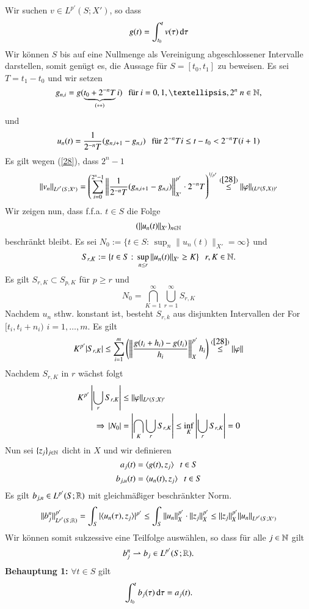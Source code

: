 \item %
Wir suchen $v\in L^{p'}(S;X')$, so dass
\[
    g(t)=\int_{t_0}^t v(\tau) \, \mathrm{d} \tau
\]
Wir können $S$ bis auf eine Nullmenge als Vereinigung abgeschlossener Intervalle darstellen, somit genügt
es, die Aussage für $S=[t_0,t_1]$ zu beweisen. Es sei $T=t_1-t_0$ und wir setzen
\[
    g_{n,i} = g(\underbrace{t_0+2^{-n}T}_{(**)}i) \qq\text{für $i=0,1,…,2^n$ $n\in\N$},
\]
und
\[
    u_n(t)=\frac1{2^{-n}T} (g_{n,i+1}-g_{n,i})\hspace{.25cm} \text{für $2^{-n}Ti\leq t-t_0<2^{-n}T(i+1)$}
\]
Es gilt wegen (\ref{28}), dass $2^n-1$
\begin{align}\label{29}
    \|v_n\|_{L^{p'}(S;X')} = \left( \sum_{i=0}^{2^n-1}\left\| \frac1{2^{-n}T}(g_{n,i+1}-g_{n,i}) \right\|
    ^{p'}_{X'}\cdot 2^{-n}T\right)^{\nicefrac1{p'}} \overset{(\ref{28})}{\leq} \|\varphi\|_{(L^p(S,X))'}
\end{align}
Wir zeigen nun, dass f.f.a. $t\in S$ die Folge
\[
    (\|u_n(t)\|_{X'})_{n\in\mathbb{N}}
\]
beschränkt bleibt. Es sei $N_0:=\{t\in S: \, \sup_{n}\|u_n(t)\|_{X'}=\infty \}$ und
\[
    S_{r,K}:= \{t\in S: \, \sup_{n\leq r} \|u_n(t)\|_{X'}\geq K\} \hspace{.25cm} r,K\in \mathbb{N}.
\]
Es gilt $S_{r,K}\subset S_{p,K}$ für $p\geq r$ und
\[
    N_0 = \bigcap_{K=1}^\infty \bigcup_{r=1}^\infty S_{r,K}
\]
Nachdem $u_n$ sthw. konstant ist, besteht $S_{r,k}$ aus disjunkten Intervallen der For $[t_i,t_i+n_i)$ 
$i=1, … , m$. Es gilt
\[
    K^{p'}|S_{r,K}|\leq \sum_{i=1}^m \left( \left\| \frac{g(t_i+h_i)-g(t_i)}{h_i}\right\|^{p'}_{X} h_i
            \right) \overset{(\ref{28})}{\leq} \|\varphi\|
\]
Nachdem $S_{r,K}$ in $r$ wächst folgt
\begin{align*}
    K^{p'} \left|\bigcup_rS_{r,K}\right| &\leq \|\varphi\|_{L^p(S;X)'}\\
    \Rightarrow \, |N_0|&=\left| \bigcap_K\bigcup_r S_{r,K} \right| \leq \inf_{K}\left|\bigcup _r S_{r,K} \right|
    =0
\end{align*}
Nun sei $\{z_j\}_{j\in\mathbb{N}}$ dicht in $X$ und wir definieren
\[
    a_j(t)=\langle g(t), z_j\rangle \hspace{.25cm} t\in S
\]
\[
    b_{j,u}(t) =\langle u_n(t), z_j \rangle \hspace{.25cm} t\in S 
\]
Es gilt $b_{j,n}\in L^{p'}(S;\mathbb{R})$ mit gleichmäßiger beschränkter Norm.
\[
    \|b_j^n\|_{L^{p'}(S;\mathbb{R})}^{p'}=\int_S|\langle u_n(\tau), z_j\rangle|^{p'}\leq \int_S \|u_n\|_X^{p'} \cdot
    \|z_j\|_X^{p'} \leq \|z_j\|_X^{p'} \|u_n\|_{L^{p'}(S;X')}
\]
Wir können somit sukzessive eine Teilfolge auswählen, so dass für alle $j\in \mathbb{N}$ gilt
\[
    b_j^n\rightharpoonup b_j \in L^{p'}(S;\mathbb{R}).
\]
\textbf{Behauptung 1:} $\forall t\in S$ gilt
\[
    \int_{t_0}^t b_j(\tau) \, \mathrm{d} \tau= a_j (t).
\]
